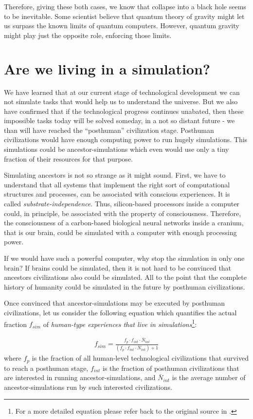 \documentclass[twoside,11pt]{article}
\begin{document}
Therefore, giving these both cases, we know that collapse into a black hole seems to be inevitable.
Some scientist believe that quantum theory of gravity might let us surpass the known limits of quantum computers.
However, quantum gravity might play just the opposite role, enforcing those limits.
 
\section{Are we living in a simulation?}
\label{sec:sim}

We have learned that at our current stage of technological development we can not simulate tasks that would help us to understand the universe.
But we also have confirmed that if the technological progress continues unabated, then these impossible tasks today will be solved someday, in a not so distant future - we than will have reached the ``posthuman'' civilization stage.
Posthuman civilizations would have enough computing power to run hugely simulations.
This simulations could be ancestor-simulations which even would use only a tiny fraction of their resources for that purpose.

Simulating ancestors is not so strange as it might sound.
First, we have to understand that all systems that implement the right sort of computational structures and processes, can be associated with conscious experiences.
It is called \emph{substrate-independence}.
Thus, silicon-based processors inside a computer could, in principle, be associated with the property of consciousness.
Therefore, the consciousness of a carbon-based biological neural networks inside a cranium, that is our brain, could be simulated with a computer with enough processing power.

If we would have such a powerful computer, why stop the simulation in only one brain?
If brains could be simulated, then it is not hard to be convinced that ancestors civilizations also could be simulated.
All to the point that the complete history of humanity could be simulated in the future by posthuman civilizations.

Once convinced that ancestor-simulations may be executed by posthuman civilizations, let us consider the following equation which quantifies the actual fraction $f_{sim}$ of \emph{human-type experiences that live in simulations}\footnote{For a more detailed equation please refer back to the original source in \citep{bostrom2003we}.}:

\begin{eqnarray*}
	f_{sim} = \frac{f_p \cdot f_{int} \cdot \bar{N}_{int}}{(f_p \cdot f_{int} \cdot \bar{N}_{int}) + 1}
\end{eqnarray*}
where 
$f_p$ is the fraction of all human-level technological civilizations that survived to reach a posthuman stage,
$f_{int}$ is the fraction of posthuman civilizations that are interested in running ancestor-simulations, and
$\bar{N}_{int}$ is the average number of ancestor-simulations run by such interested civilizations.
\end{document}
